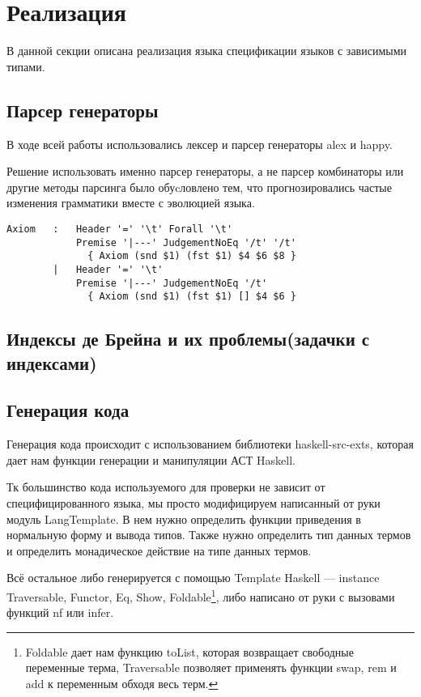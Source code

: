 \section{Реализация}
В данной секции описана реализация языка спецификации языков с зависимыми типами.

\subsection{Парсер генераторы}
В ходе всей работы использовались лексер и парсер генераторы alex\cite{alex} и happy\cite{happy}.

Решение использовать именно парсер генераторы, а не парсер комбинаторы\cite{parsec} или другие методы парсинга было обуcловлено тем, что прогнозировались частые изменения грамматики вместе с эволюцией языка.

\begin{lstlisting}[caption={Часть спецификации парсера},captionpos=b]
Axiom   :   Header '=' '\t' Forall '\t'
            Premise '|---' JudgementNoEq '/t' '/t'
              { Axiom (snd $1) (fst $1) $4 $6 $8 }
        |   Header '=' '\t'
            Premise '|---' JudgementNoEq '/t'
              { Axiom (snd $1) (fst $1) [] $4 $6 }
\end{lstlisting}

\subsection{Индексы де Брейна и их проблемы(задачки с индексами)}\label{de_brujin_impl}




\subsection{Генерация кода}
Генерация кода происходит с использованием библиотеки haskell-src-exts\cite{src_exts}, которая дает нам функции генерации и манипуляции АСТ Haskell.

Тк большинство кода используемого для проверки не зависит от специфицированного языка, мы просто модифицируем написанный от руки модуль LangTemplate. В нем нужно определить функции приведения в нормальную форму и вывода типов. Также нужно определить тип данных термов и определить монадическое действие на типе данных термов.

Всё остальное либо генерируется с помощью Template Haskell\cite{TH} --- instance Traversable, Functor, Eq, Show, Foldable\footnote{Foldable дает нам функцию toList, которая возвращает свободные переменные терма, Traversable позволяет применять функции swap, rem и add  к переменным обходя весь терм.}, либо написано от руки с вызовами функций nf или infer.

